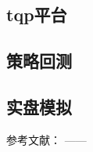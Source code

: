 \documentclass{article}
\begin{document}
\subsection{tqp平台}
\subsection{策略回测}
\subsection{实盘模拟}



参考文献：
\cite{ex1}---\cite{ex2}---\cite{refa001}

\newpage




\appendix
\end{document}
